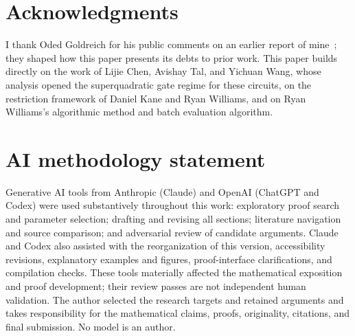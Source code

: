 \documentclass[11pt,letterpaper]{article}
\theoremstyle{definition}
\theoremstyle{remark}
\begin{document}
\section*{Acknowledgments}
I thank Oded Goldreich for his public comments on an earlier report of
mine~\cite{NagCubic}; they shaped how this paper presents its debts to
prior work. This paper builds directly on the work of Lijie Chen,
Avishay Tal, and Yichuan Wang, whose analysis opened the superquadratic
gate regime for these circuits, on the restriction framework of Daniel
Kane and Ryan Williams, and on Ryan Williams's algorithmic method
and batch evaluation algorithm.

\section*{AI methodology statement}
Generative AI tools from Anthropic (Claude) and OpenAI (ChatGPT and
Codex) were used substantively throughout this work: exploratory
proof search and parameter selection; drafting and revising all
sections; literature navigation and source comparison; and adversarial
review of candidate arguments. Claude and Codex also assisted with the reorganization of this version,
accessibility revisions, explanatory examples and figures,
proof-interface clarifications, and compilation checks.
These tools materially affected the mathematical exposition and proof
development; their review passes are not independent human validation.
The author selected the research targets and retained arguments and
takes responsibility for the mathematical claims, proofs, originality,
citations, and final submission. No model is an author.
\end{document}
